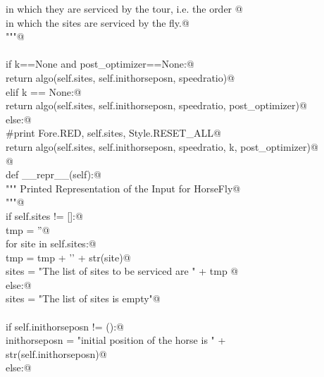 \documentclass[11.5pt]{report}
\begin{document}
\begin{flushleft}
\begin{list}{}{}
\mbox{}\verb@            in which they are serviced by the tour, i.e. the order @\\
\mbox{}\verb@            in which the sites are serviced by the fly.@\\
\mbox{}\verb@          """@\\
\mbox{}\verb@@\\
\mbox{}\verb@          if k==None and post_optimizer==None:@\\
\mbox{}\verb@                return algo(self.sites, self.inithorseposn, speedratio)@\\
\mbox{}\verb@          elif k == None:@\\
\mbox{}\verb@                return algo(self.sites, self.inithorseposn, speedratio, post_optimizer)@\\
\mbox{}\verb@          else:@\\
\mbox{}\verb@                #print Fore.RED, self.sites, Style.RESET_ALL@\\
\mbox{}\verb@                return algo(self.sites, self.inithorseposn, speedratio, k, post_optimizer)@\\
\mbox{}\verb@          @\\
\mbox{}\verb@      def __repr__(self):@\\
\mbox{}\verb@          """ Printed Representation of the Input for HorseFly@\\
\mbox{}\verb@          """@\\
\mbox{}\verb@          if self.sites != []:@\\
\mbox{}\verb@              tmp = ''@\\
\mbox{}\verb@              for site in self.sites:@\\
\mbox{}\verb@                  tmp = tmp + '\n' + str(site)@\\
\mbox{}\verb@              sites = "The list of sites to be serviced are " + tmp    @\\
\mbox{}\verb@          else:@\\
\mbox{}\verb@              sites = "The list of sites is empty"@\\
\mbox{}\verb@@\\
\mbox{}\verb@          if self.inithorseposn != ():@\\
\mbox{}\verb@              inithorseposn = "\nThe initial position of the horse is " + \@\\
\mbox{}\verb@                               str(self.inithorseposn)@\\
\mbox{}\verb@          else:@\\

\end{list}
\end{flushleft}
\end{document}
